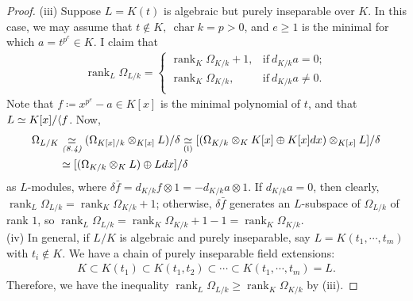 \documentclass[11pt,a4paper,footinclude=true,headinclude=true]{scrbook} %
\let\Im\relax
\DeclareMathOperator{\Im}{Im}
\DeclareMathOperator{\Char}{char}
\DeclareMathOperator{\rank}{rank}
\newcommand{\<}{\langle}
\let\>\relax
\newcommand{\>}{\rangle}
\begin{document}
\begin{proof}
    (iii) Suppose $L=K(t)$ is algebraic but purely inseparable over $K$. In this case, we may assume that $t\notin K,\ \Char k=p>0$, and $e\geq1$ is the minimal for which $a=t^{p^e}\in K$. I claim that
    \begin{align*}
        \rank_L\Omega_{L/k}=\left\{\begin{array}{lc}
        \rank_K\Omega_{K/k}+1, &\text{if}\ d_{K/k}a=0; \\ 
        \rank_K\Omega_{K/k}, &\text{if}\ d_{K/k}a\neq0.\\ 
        \end{array}\right.
    \end{align*}
    Note that $f\coloneqq x^{p^e}-a\in K[x]$ is the minimal polynomial of $t$, and that $L\simeq K[x]/\<f\>$. Now, 
    \begin{align*}
        \Omega_{L/K} &\underset{\textit{(8.4)}}{\simeq}(\Omega_{K[x]/k}\otimes_{K[x]}L)/\Im\delta \underset{\text{(i)}}{\simeq}[(\Omega_{K/k}\otimes_KK[x]\oplus K[x]dx)\otimes_{K[x]}L]/\Im\delta\\  &\simeq[(\Omega_{K/k}\otimes_KL)\oplus Ldx]/\Im\delta
    \end{align*}
    as $L$-modules, where $\delta\bar{f}=d_{K/k}f\otimes1=-d_{K/k}a\otimes1$. If $d_{K/k}a=0$, then clearly, $\rank_L\Omega_{L/k}=\rank_K\Omega_{K/k}+1$; otherwise, $\delta\bar{f}$ generates an $L$-subspace of $\Omega_{L/k}$ of rank $1$, so $\rank_L\Omega_{L/k}=\rank_K\Omega_{K/k}+1-1=\rank_K\Omega_{K/k}$.\\
    
    (iv) In general, if $L/K$ is algebraic and purely inseparable, say $L=K(t_1,\cdots,t_m)$ with $t_i\notin K$. We have a chain of purely inseparable field extensions:
    \begin{align*}
        K\subset K(t_1)\subset K(t_1,t_2)\subset\cdots\subset K(t_1,\cdots,t_m)=L.
    \end{align*}
    Therefore, we have the inequality $\rank_L\Omega_{L/k}\geq\rank_K\Omega_{K/k}$ by (iii).
\end{proof}
\end{document}
